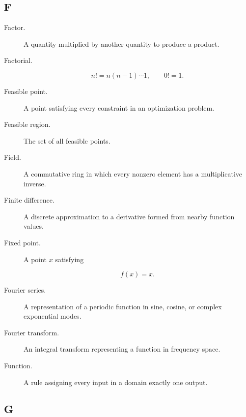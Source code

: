 \subsection*{F}

\begin{description}

\item[Factor.]
A quantity multiplied by another quantity to produce a product.

\item[Factorial.]

\[
n!
=
n(n-1)\cdots1,
\qquad
0!=1.
\]

\item[Feasible point.]
A point satisfying every constraint in an optimization problem.

\item[Feasible region.]
The set of all feasible points.

\item[Field.]
A commutative ring in which every nonzero element has a multiplicative
inverse.

\item[Finite difference.]
A discrete approximation to a derivative formed from nearby function values.

\item[Fixed point.]
A point \(x\) satisfying

\[
f(x)=x.
\]

\item[Fourier series.]
A representation of a periodic function in sine, cosine, or complex
exponential modes.

\item[Fourier transform.]
An integral transform representing a function in frequency space.

\item[Function.]
A rule assigning every input in a domain exactly one output.

\end{description}

\subsection*{G}

